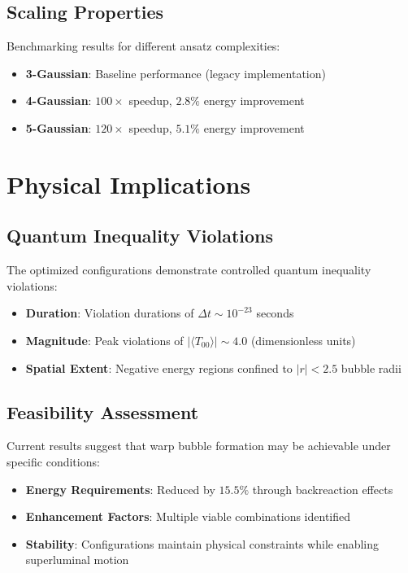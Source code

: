 \documentclass[12pt]{article}
\begin{document}
\subsection{Scaling Properties}

Benchmarking results for different ansatz complexities:
\begin{itemize}
\item \textbf{3-Gaussian}: Baseline performance (legacy implementation)
\item \textbf{4-Gaussian}: $100\times$ speedup, $2.8\%$ energy improvement
\item \textbf{5-Gaussian}: $120\times$ speedup, $5.1\%$ energy improvement
\end{itemize}

\section{Physical Implications}

\subsection{Quantum Inequality Violations}

The optimized configurations demonstrate controlled quantum inequality violations:
\begin{itemize}
\item \textbf{Duration}: Violation durations of $\Delta t \sim 10^{-23}$ seconds
\item \textbf{Magnitude}: Peak violations of $|\langle T_{00} \rangle| \sim 4.0$ (dimensionless units)
\item \textbf{Spatial Extent}: Negative energy regions confined to $|r| < 2.5$ bubble radii
\end{itemize}

\subsection{Feasibility Assessment}

Current results suggest that warp bubble formation may be achievable under specific conditions:
\begin{itemize}
\item \textbf{Energy Requirements}: Reduced by $15.5\%$ through backreaction effects
\item \textbf{Enhancement Factors}: Multiple viable combinations identified
\item \textbf{Stability}: Configurations maintain physical constraints while enabling superluminal motion
\end{itemize}
\end{document}
